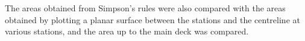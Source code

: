 \documentclass[12pt,a4paper,twoside]{report}
\begin{document}
\vspace{\baselineskip}\par\noindent The areas obtained from Simpson's rules were also compared with the
areas obtained by plotting a planar surface between the stations and
the centreline at various stations, and the area up to the main deck
was compared.
\begin{table}[H]
\centering
\caption{Bonjean Areas}
\vspace{2mm}
\label{tab:sectional_areas}

\end{table}
\end{document}
